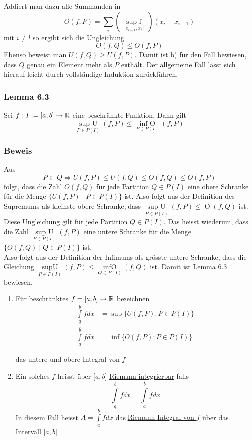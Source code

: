Addiert man dazu alle Summanden in \[O(f,P)=\sum\limits_i {(\mathop {\sup {\text{ }}f}\limits_{[{x_{i - 1}},{x_i}]} )({x_i} - {x_{i - 1}})} \]
mit $i\neq l$ so ergibt sich die Ungleichung \[O(f,Q)\leq O(f,P)\]
Ebenso beweist man $U(f,Q)\geq U(f,P)$. Damit ist b) für den Fall bewiesen, dass $Q$ genau ein Element mehr als $P$ enthält. Der allgemeine Fall lässt sich hierauf leicht durch vollständige Induktion zurückführen.

\subsubsection*{Lemma 6.3} Sei $f:I:=\lbrack a,b \rbrack \to \mathbb{R}$ eine beschränkte Funktion. Dann gilt \[\mathop {\sup {\text{ }}U}\limits_{P \in P(I)} (f,P) \le \mathop {\inf {\text{ }}O}\limits_{P \in P(I)} (f,P)\]

\subsubsection*{Beweis}
Aus \[P\subset Q \Rightarrow U(f,P) \leq U(f,Q) \leq O(f,Q) \leq O(f,P)\] folgt, dass die Zahl $O(f,Q)$ für jede Partition $Q\in P(I)$ eine obere Schranke für die Menge $\{ U(f,P)\mid P\in P(I)\}$ ist. Also folgt aus der Definition des Supremums als kleinste obere Schranke, dass $\mathop {\sup {\text{ }}U}\limits_{P \in P(I)} (f,P) \le \mathop O(f,Q)$ ist. \\
\newpage
Diese Ungleichung gilt für jede Partition $Q\in P(I)$. Das heisst wiederum, dass die Zahl $\mathop {\sup {\text{ }}U}\limits_{P \in P(I)} (f,P)$ eine untere Schranke für die Menge $\{ O(f,Q)\mid Q \in P(I)\} $ ist.\\

Also folgt aus der Definition der Infimums als grösste untere Schranke, dass die Gleichung $\mathop {\sup U}\limits_{P \in P(I)} (f,P) \le \mathop {\inf O}\limits_{Q \in P(I)} (f,Q)$ ist. Damit ist Lemma 6.3 bewiesen.
\begin{definition}{6.4}
\begin{enumerate}[\indent 1)]

\item Für beschränktes $f=\lbrack a,b \rbrack\rightarrow \mathbb{R}$ bezeichnen
\begin{align*}
\int\limits_{\underline{a}}^b fdx &=\sup \{ U(f,P):P \in P(I)\}\\
\int\limits_{a}^{\overline{b}} fdx &=\inf \{ O(f,P):P \in P(I)\}
\end{align*}

das untere und obere Integral von $f$.
\item Ein solches $f$ heisst über $\lbrack a,b\rbrack$ \underline{Riemann-integrierbar} falls \[\int\limits_{\underline{a}}^b {fdx}  = \int\limits_a^{\overline{b}} {fdx} \] In diesem Fall heisst $A = \int\limits_a^b {fdx} $ das \underline{Riemann-Integral von $f$} über das Intervall $\lbrack a,b\rbrack$
\end{enumerate}
\end{definition}

